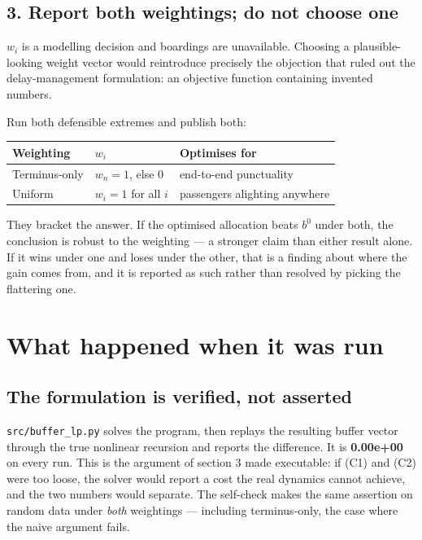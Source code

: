 \documentclass[11pt,a4paper]{article}
\newcommand{\code}[1]{\texttt{\small #1}}
\begin{document}
\subsection*{3. Report both weightings; do not choose one}

$w_i$ is a modelling decision and boardings are unavailable. Choosing a plausible-looking
weight vector would reintroduce precisely the objection that ruled out the delay-management
formulation: an objective function containing invented numbers.

Run both defensible extremes and publish both:

\begin{center}
\begin{tabular}{@{}lll@{}}
\toprule
\textbf{Weighting} & \textbf{$w_i$} & \textbf{Optimises for} \\
\midrule
Terminus-only & $w_n = 1$, else $0$ & end-to-end punctuality \\
Uniform & $w_i = 1$ for all $i$ & passengers alighting anywhere \\
\bottomrule
\end{tabular}
\end{center}

\noindent They bracket the answer. If the optimised allocation beats $b^0$ under both, the
conclusion is robust to the weighting --- a stronger claim than either result alone. If it
wins under one and loses under the other, that is a finding about where the gain comes
from, and it is reported as such rather than resolved by picking the flattering one.

\section{What happened when it was run}

\subsection*{The formulation is verified, not asserted}

\code{src/buffer\_lp.py} solves the program, then replays the resulting buffer vector through
the true nonlinear recursion and reports the difference. It is \textbf{0.00e+00} on every
run. This is the argument of section 3 made executable: if (C1) and (C2) were too loose, the
solver would report a cost the real dynamics cannot achieve, and the two numbers would
separate. The self-check makes the same assertion on random data under \emph{both}
weightings --- including terminus-only, the case where the naive argument fails.
\end{document}
